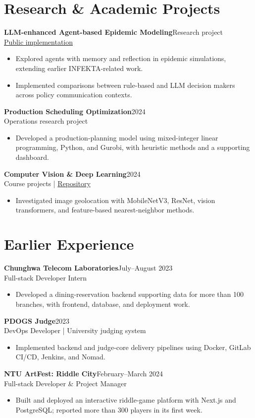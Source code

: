 \documentclass[10pt,a4paper]{article}
\newcommand{\entry}[3]{\textbf{#1}\hfill{\small\color{muted}#2}\\{\small #3}\par}
\begin{document}
\section{Research \& Academic Projects}
\entry{LLM-enhanced Agent-based Epidemic Modeling}{Research project}{\href{https://github.com/YouMingYeh/abm}{Public implementation}}
\begin{itemize}
\item Explored agents with memory and reflection in epidemic simulations, extending earlier INFEKTA-related work.
\item Implemented comparisons between rule-based and LLM decision makers across policy communication contexts.
\end{itemize}
\entry{Production Scheduling Optimization}{2024}{Operations research project}
\begin{itemize}
\item Developed a production-planning model using mixed-integer linear programming, Python, and Gurobi, with heuristic methods and a supporting dashboard.
\end{itemize}
\entry{Computer Vision \& Deep Learning}{2024}{Course projects \enspace | \enspace \href{https://github.com/YouMingYeh/dl}{Repository}}
\begin{itemize}
\item Investigated image geolocation with MobileNetV3, ResNet, vision transformers, and feature-based nearest-neighbor methods.
\end{itemize}

\section{Earlier Experience}
\entry{Chunghwa Telecom Laboratories}{July--August 2023}{Full-stack Developer Intern}
\begin{itemize}
\item Developed a dining-reservation backend supporting data for more than 100 branches, with frontend, database, and deployment work.
\end{itemize}
\entry{PDOGS Judge}{2023}{DevOps Developer \enspace | \enspace University judging system}
\begin{itemize}
\item Implemented backend and judge-core delivery pipelines using Docker, GitLab CI/CD, Jenkins, and Nomad.
\end{itemize}
\entry{NTU ArtFest: Riddle City}{February--March 2024}{Full-stack Developer \& Project Manager}
\begin{itemize}
\item Built and deployed an interactive riddle-game platform with Next.js and PostgreSQL; reported more than 300 players in its first week.
\end{itemize}
\end{document}
